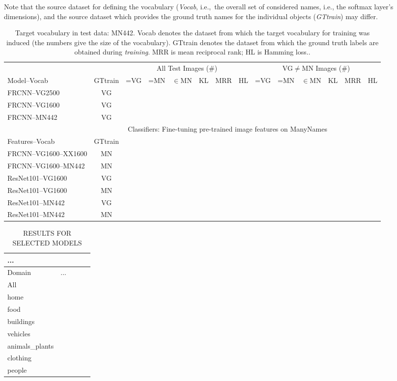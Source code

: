 \documentclass[11pt,a4paper]{article}
\newcommand{\mn}{ManyNames\xspace}
\begin{document}
Note that the source dataset for defining the vocabulary (\textsl{Vocab}, i.e.,\ the overall set of considered names, i.e., the softmax layer's dimensions), and the source dataset which provides the ground truth names for the individual objects (\textsl{GTtrain}) may differ.  
\begin{table}[t]
	\centering
	\small
	\begin{tabular}{l|c|r@{~}r@{~}r@{~}r@{~}r@{~}r|@{~}r@{~}r@{~}r@{~}r@{~}r@{~}r@{~}}
		\toprule
		&   & \multicolumn{6}{c}{All Test Images ($\#$)} 
		& \multicolumn{6}{c}{VG$\neq$MN Images ($\#$)}\\	
		Model--Vocab	 
		&  GTtrain &  =VG & =MN & $\in$MN  & KL & MRR & HL 
		&  =VG & =MN & $\in$MN  & KL & MRR & HL\\ 
		\midrule
		FRCNN--VG2500 & VG \\
		FRCNN--VG1600 & VG \\
		FRCNN--MN442 & VG \\
		\midrule \midrule
		& \multicolumn{12}{c}{Classifiers: Fine-tuning pre-trained image features on \mn}\\
		Features--Vocab & GTtrain  \\
		\midrule 
		FRCNN--VG1600--XX1600 & MN \\
		FRCNN--VG1600--MN442 &  MN \\
		ResNet101--VG1600 & VG \\
		ResNet101--VG1600 & MN \\
		ResNet101--MN442 & VG \\
		ResNet101--MN442 & MN \\
		\bottomrule
	\end{tabular}
	\caption{Target vocabulary in test data: MN442. Vocab denotes the dataset from which the target vocabulary for training was induced (the numbers give the size of the vocabulary). GTtrain denotes the dataset from which the ground truth labels are obtained during \textit{training}. MRR is mean reciprocal rank; HL is Hamming loss.\label{tab:entrylevels}. }
\end{table}


\begin{table}[t]
	\centering
	\small
	\begin{tabular}{l@{~}|rrrr}
		\toprule
		... \\
		\midrule
		Domain	 & ... \\ 
		\midrule
		All           \\
		home           \\
		food           \\
		buildings      \\
		vehicles       \\
		animals\_plants \\
		clothing       \\
		people         \\
		\bottomrule
	\end{tabular}
	\caption{RESULTS FOR SELECTED MODELS \label{tab:domains_bestmodel}}
\end{table}
\end{document}
